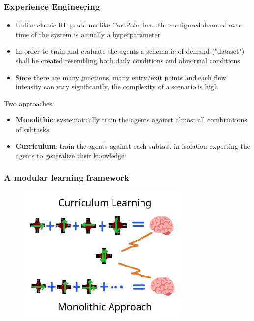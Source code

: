 \documentclass[dvipsnames]{beamer}
\begin{document}
\begin{frame}
\frametitle{Experience Engineering}
  \begin{itemize}
    \item Unlike classic RL problems like CartPole, here the configured demand over time of the system is actually a hyperparameter
    \item In order to train and evaluate the agents a schematic of demand ("dataset") shall be created resembling both daily conditions and abnormal conditions
    \item Since there are many junctions, many entry/exit points and each flow intensity can vary significantly, the complexity of a scenario is high
  \end{itemize}
  
  Two approaches:
  \begin{itemize}
    \item \textbf{Monolithic}: systematically train the agents against almost all combinations of subtasks
    \item \textbf{Curriculum}: train the agents against each subtask in isolation expecting the agents to generalize their knowledge
  \end{itemize}
  
\end{frame}

\begin{frame}
\frametitle{A modular learning framework}
  \begin{figure}
    \centering
    \includegraphics[width=0.75\textwidth]{figures/curriculum-vs-monolithic.png}
  \end{figure}
\end{frame}
\end{document}
